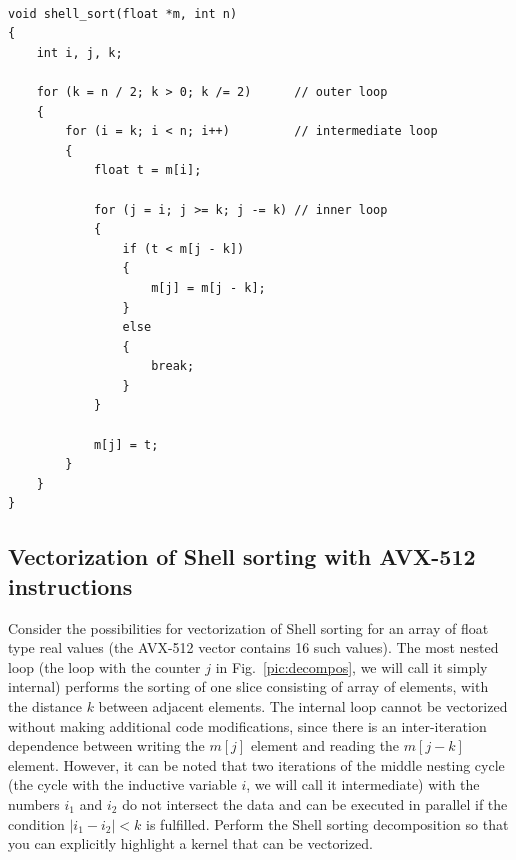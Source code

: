 \documentclass[
11pt,%
tightenlines,%
twoside,%
onecolumn,%
nofloats,%
nobibnotes,%
nofootinbib,%
superscriptaddress,%
noshowpacs,%
centertags]%
{revtex4}
\begin{document}
\begin{lstlisting}[caption={Shell sorting.},label={lst:shellsort}]

void shell_sort(float *m, int n)
{
    int i, j, k;

    for (k = n / 2; k > 0; k /= 2)      // outer loop
    {
        for (i = k; i < n; i++)         // intermediate loop
        {
            float t = m[i];

            for (j = i; j >= k; j -= k) // inner loop
            {
                if (t < m[j - k])
                {
                    m[j] = m[j - k];
                }
                else
                {
                    break;
                }
            }
            
            m[j] = t;
        }
    }
}
\end{lstlisting}

\subsection{Vectorization of Shell sorting with AVX-512 instructions}

Consider the possibilities for vectorization of Shell sorting for an array of float type real values (the AVX-512 vector contains 16 such values).
The most nested loop (the loop with the counter $ j $ in Fig.~\ref{pic:decompos}, we will call it simply internal) performs the sorting of one slice consisting of array of elements, with the distance $ k $ between adjacent elements.
The internal loop cannot be vectorized without making additional code modifications, since there is an inter-iteration dependence between writing the $ m [j] $ element and reading the $ m [j - k] $ element. However, it can be noted that two iterations of the middle nesting cycle (the cycle with the inductive variable $ i $, we will call it intermediate) with the numbers $ i_1 $ and $ i_2 $ do not intersect the data and can be executed in parallel if the condition $ | i_1 - i_2 | < k $ is fulfilled.
Perform the Shell sorting decomposition so that you can explicitly highlight a kernel that can be vectorized.
\end{document}
